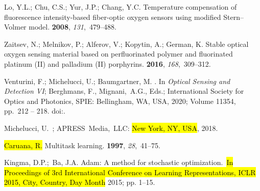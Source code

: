 \documentclass[sensors,article,accept,moreauthors,pdftex,10pt,a4paper]{Definitions/mdpi}
\begin{document}
\begin{thebibliography}{999}
Lo, Y.L.; Chu, C.S.; Yur, J.P.; Chang, Y.C.
\newblock Temperature compensation of fluorescence intensity-based fiber-optic
  oxygen sensors using modified Stern--Volmer model.
 {\bf 2008}, {\em
  131},~479--488.

Zaitsev, N.; Melnikov, P.; Alferov, V.; Kopytin, A.; German, K.
\newblock Stable optical oxygen sensing material based on perfluorinated
  polymer and fluorinated platinum (II) and palladium (II) porphyrins.
 {\bf 2016}, {\em 168},~309--312.

Venturini, F.; Michelucci, U.; Baumgartner, M.
.
\newblock  In \emph{Optical Sensing and Detection VI}; Berghmans, F., Mignani,~A.G., Eds.;
  International Society for Optics and Photonics, SPIE: Bellingham, WA, USA,  2020; Volume 11354, pp.~212 -- 218.
\newblock
  doi:{\href{https://doi.org/10.1117/12.2554941}{}}.

Michelucci, U.~; APRESS~Media,~LLC: \hl{New York, NY, USA}, 2018. %
 

\hl{Caruana, R.}
\newblock Multitask learning.
 {\bf 1997}, {\em 28},~41--75.  %

Kingma, D.P.;~Ba, J.A.
\newblock Adam: A method for stochastic optimization.~\newblock \hl{In Proceedings of 3rd International Conference on Learning
  Representations, ICLR 2015, City, Country, Day Month} 2015; pp. 1--15. %

\end{thebibliography}

\end{document}
